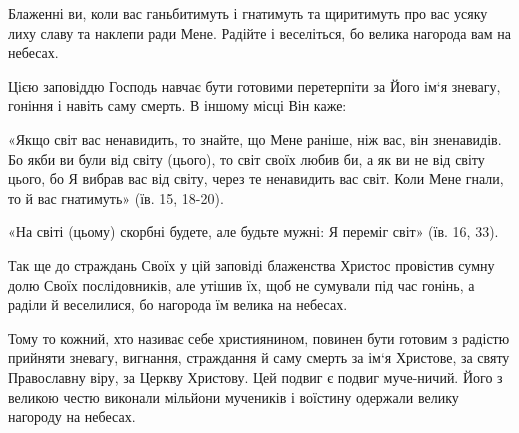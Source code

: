 \documentclass[main.tex]{subfiles}
\begin{document}
Блаженні ви, коли вас ганьбитимуть і гнатимуть та щиритимуть про вас усяку лиху славу та наклепи ради Мене. Радійте і веселіться, бо велика нагорода вам на небесах.

Цією заповіддю Господь навчає бути готовими перетерпіти за Його ім`я зневагу, гоніння і навіть саму смерть. В іншому місці Він каже:

«Якщо світ вас ненавидить, то знайте, що Мене раніше, ніж вас, він зненавидів. Бо якби ви були від світу (цього), то світ своїх любив би, а як ви не від світу цього, бо Я вибрав вас від світу, через те ненавидить вас світ. Коли Мене гнали, то й вас гнатимуть» (їв. 15, 18-20).

«На світі (цьому) скорбні будете, але будьте мужні: Я переміг світ» (їв. 16, 33).

Так ще до страждань Своїх у цій заповіді блаженства Христос провістив сумну долю Своїх послідовників, але утішив їх, щоб не сумували під час гонінь, а раділи й веселилися, бо нагорода їм велика на небесах.

Тому то кожний, хто називає себе християнином, повинен бути готовим з радістю прийняти зневагу, вигнання, страждання й саму смерть за ім`я Христове, за святу Православну віру, за Церкву Христову. Цей подвиг є подвиг муче-ничий. Його з великою честю виконали мільйони мучеників і воїстину одержали велику нагороду на небесах.
\end{document}
